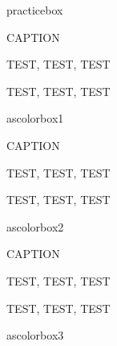% 
% 
% 
% 
% 
% 
% 
% 

practicebox
\begin{practicebox}{CAPTION}

TEST, TEST, TEST

\end{practicebox}

\begin{practicebox}{}

TEST, TEST, TEST

\end{practicebox}

ascolorbox1

\begin{ascolorbox1}{CAPTION}

TEST, TEST, TEST

\end{ascolorbox1}

\begin{ascolorbox1}{}

TEST, TEST, TEST

\end{ascolorbox1}

ascolorbox2

\begin{ascolorbox2}{CAPTION}

TEST, TEST, TEST

\end{ascolorbox2}

\begin{ascolorbox2}{}

TEST, TEST, TEST

\end{ascolorbox2}

ascolorbox3

